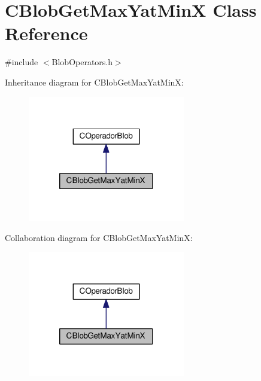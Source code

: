 \hypertarget{classCBlobGetMaxYatMinX}{\section{C\-Blob\-Get\-Max\-Yat\-Min\-X Class Reference}
\label{classCBlobGetMaxYatMinX}
}


{\ttfamily \#include $<$Blob\-Operators.\-h$>$}



Inheritance diagram for C\-Blob\-Get\-Max\-Yat\-Min\-X\-:\nopagebreak
\begin{figure}[H]
\begin{center}
\leavevmode
\includegraphics[width=194pt]{classCBlobGetMaxYatMinX__inherit__graph}
\end{center}
\end{figure}


Collaboration diagram for C\-Blob\-Get\-Max\-Yat\-Min\-X\-:\nopagebreak
\begin{figure}[H]
\begin{center}
\leavevmode
\includegraphics[width=194pt]{classCBlobGetMaxYatMinX__coll__graph}
\end{center}
\end{figure}
